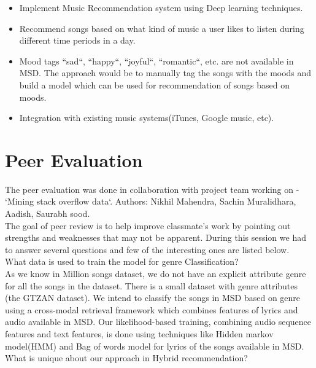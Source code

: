 \documentclass{sig-alternate-05-2015}
\begin{document}
\begin{itemize}
    \item Implement Music Recommendation system using Deep learning techniques.
    \item Recommend songs based on what kind of music a user likes to listen during different time periods in a day.
    \item Mood tags ``sad``, ``happy``, ``joyful``, ``romantic``, etc. are not available in MSD. The approach would be to manually tag the songs with the moods and build a model which can be used for recommendation of songs based on moods. \\
    \item Integration with existing music systems(iTunes, Google music, etc). \\
\end{itemize}

\section{Peer Evaluation}

The peer evaluation was done in collaboration with project team working on - `Mining stack overflow data`. Authors: Nikhil Mahendra, Sachin Muralidhara, Aadish, Saurabh sood.\\

The goal of peer review is to help improve classmate's work by pointing out strengths and weaknesses that may not be apparent. During this session we had to answer several questions and few of the interesting ones are listed below.\\

What data is used to train the model for genre Classification? \\

As we know in Million songs dataset, we do not have an explicit attribute genre for all the songs in the dataset. There is a small dataset with genre attributes (the GTZAN dataset). We intend to classify the songs in MSD based on genre using a cross-modal retrieval framework which combines features of lyrics and audio available in MSD. Our likelihood-based training, combining audio sequence features and text features, is done using techniques like Hidden markov model(HMM) and Bag of words model for lyrics of the songs available in MSD.\\

What is unique about our approach in Hybrid recommendation? \\
\end{document}
